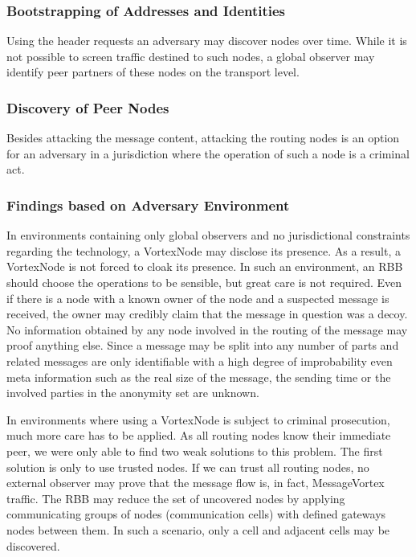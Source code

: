 \documentclass[10pt,journal,compsoc,twocolumn,twoside]{IEEEtran}
\begin{document}
\subsubsection{Bootstrapping of Addresses and Identities}
Using the header requests an adversary may discover nodes over time. While it is not possible to screen traffic destined to such nodes, a global observer may identify peer partners of these nodes on the transport level.

\subsubsection{Discovery of Peer Nodes}
Besides attacking the message content, attacking the routing nodes is an option for an adversary in a jurisdiction where the operation of such a node is a criminal act. 

\subsubsection{Findings based on Adversary Environment}
In environments containing only global observers and no jurisdictional constraints regarding the technology, a VortexNode may disclose its presence. As a result, a VortexNode is not forced to cloak its presence. In such an environment, an RBB should choose the operations to be sensible, but great care is not required. Even if there is a node with a known owner of the node and a suspected message is received, the owner may credibly claim that the message in question was a decoy. No information obtained by any node involved in the routing of the message may proof anything else. Since a message may be split into any number of parts and related messages are only identifiable with a high degree of improbability even meta information such as the real size of the message, the sending time or the involved parties in the anonymity set are unknown. %

In environments where using a VortexNode is subject to criminal prosecution, much more care has to be applied. As all routing nodes know their immediate peer, we were only able to find two weak solutions to this problem. The first solution is only to use trusted nodes. If we can trust all routing nodes, no external observer may prove that the message flow is, in fact, MessageVortex traffic. The RBB may reduce the set of uncovered nodes by applying communicating groups of nodes (communication cells) with defined gateways nodes between them. In such a scenario, only a cell and adjacent cells may be discovered.
\end{document}
